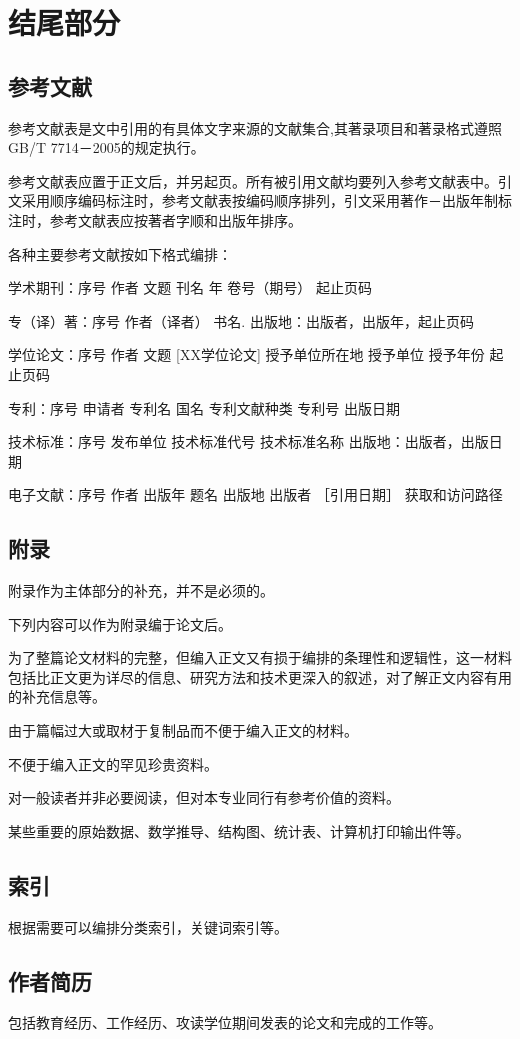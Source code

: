 \section{结尾部分} %
\label{sec:结尾部分}
\subsection{参考文献} %
\label{sub:参考文献}
参考文献表是文中引用的有具体文字来源的文献集合,其著录项目和著录格式遵照GB/T 7714－2005的规定执行。

参考文献表应置于正文后，并另起页。所有被引用文献均要列入参考文献表中。引文采用顺序编码标注时，参考文献表按编码顺序排列，引文采用著作－出版年制标注时，参考文献表应按著者字顺和出版年排序。

各种主要参考文献按如下格式编排：

学术期刊：序号 作者 文题 刊名 年 卷号（期号） 起止页码

专（译）著：序号 作者（译者） 书名. 出版地：出版者，出版年，起止页码

学位论文：序号 作者 文题 [XX学位论文] 授予单位所在地 授予单位 授予年份  起止页码

专利：序号 申请者 专利名 国名 专利文献种类 专利号 出版日期

技术标准：序号 发布单位 技术标准代号 技术标准名称 出版地：出版者，出版日期

电子文献：序号 作者 出版年 题名 出版地 出版者 ［引用日期］ 获取和访问路径
\subsection{附录} %
\label{sub:附录}
附录作为主体部分的补充，并不是必须的。

下列内容可以作为附录编于论文后。

为了整篇论文材料的完整，但编入正文又有损于编排的条理性和逻辑性，这一材料包括比正文更为详尽的信息、研究方法和技术更深入的叙述，对了解正文内容有用的补充信息等。

由于篇幅过大或取材于复制品而不便于编入正文的材料。

不便于编入正文的罕见珍贵资料。

对一般读者并非必要阅读，但对本专业同行有参考价值的资料。

某些重要的原始数据、数学推导、结构图、统计表、计算机打印输出件等。
\subsection{索引} %
\label{sub:索引}
根据需要可以编排分类索引，关键词索引等。
\subsection{作者简历} %
\label{sub:作者简历}
包括教育经历、工作经历、攻读学位期间发表的论文和完成的工作等。
